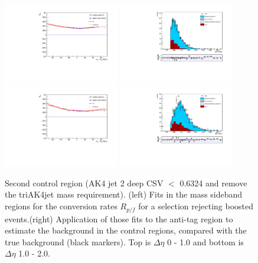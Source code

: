 \begin{figure}[h]
\centering
\includegraphics[width=0.45\textwidth]{F5/HH4b2p1SR_Fit_BG_boost_dEta0_CR2.pdf}
\includegraphics[width=0.45\textwidth]{F5/HH4b2p1_Plot_BG_boost_dEta0_CR2.pdf}\\
\includegraphics[width=0.45\textwidth]{F5/HH4b2p1SR_Fit_BG_boost_dEta1_CR2.pdf}
\includegraphics[width=0.45\textwidth]{F5/HH4b2p1_Plot_BG_boost_dEta1_CR2.pdf}
\caption{Second control region (AK4 jet 2 deep CSV $<$ 0.6324 and remove the triAK4jet mass requirement). (left) Fits in the mass sideband regions for the conversion rates $R_{p/f}$ for a selection rejecting boosted events.(right) Application of those fits to the anti-tag region to estimate the background in the control regions, compared with the true background (black markers). Top is $\Delta\eta$ 0 - 1.0 and bottom is $\Delta\eta$ 1.0 - 2.0.}
\label{fig:closuredataboost2}
\end{figure}

